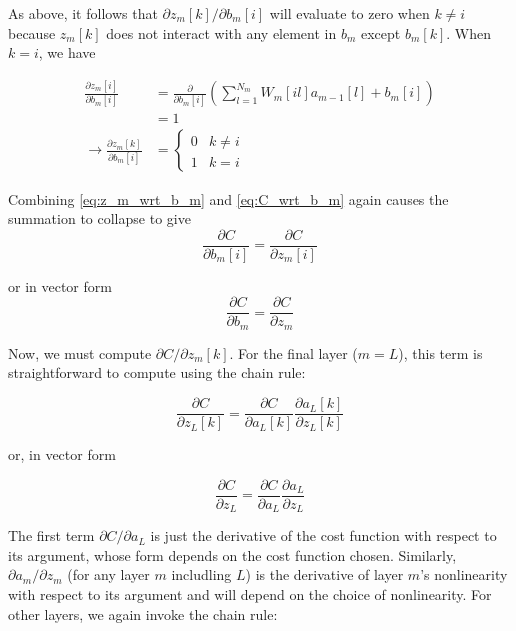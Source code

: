 As above, it follows that $\partial z_m[k]/\partial b_m[i]$ will evaluate to zero when $k \ne i$ because $z_m[k]$ does not interact with any element in $b_m$ except $b_m[k]$.  When $k = i$, we have

\begin{align}
\frac{\partial z_m[i]}{\partial b_m[i]} &= \frac{\partial}{\partial b_m[i]}\left(\sum_{l = 1}^{N_m} W_m[il] a_{m - 1}[l] + b_m[i]\right)\\
                                        &= 1\\
\rightarrow \frac{\partial z_m[k]}{\partial b_m[i]} &= \begin{cases}
0 & k \ne i\\
1 & k = i
\end{cases}
\label{eq:z_m_wrt_b_m}
\end{align}

Combining \cref{eq:z_m_wrt_b_m} and \cref{eq:C_wrt_b_m} again causes the summation to collapse to give
\begin{equation}
\frac{\partial C}{\partial b_m[i]} = \frac{\partial C}{\partial z_m[i]}
\end{equation}

or in vector form
\begin{equation}
\frac{\partial C}{\partial b_m} = \frac{\partial C}{\partial z_m}
\end{equation}

Now, we must compute $\partial C/\partial z_m[k]$.
For the final layer ($m = L$), this term is straightforward to compute using the chain rule:

$$
\frac{\partial C}{\partial z_L[k]} = \frac{\partial C}{\partial a_L[k]} \frac{\partial a_L[k]}{\partial z_L[k]}
$$

or, in vector form

$$
\frac{\partial C}{\partial z_L} = \frac{\partial C}{\partial a_L} \frac{\partial a_L}{\partial z_L}
$$

The first term $\partial C/\partial a_L$ is just the derivative of the cost function with respect to its argument, whose form depends on the cost function chosen.
Similarly, $\partial a_m/\partial z_m$ (for any layer $m$ includling $L$) is the derivative of layer $m$'s nonlinearity with respect to its argument and will depend on the choice of nonlinearity.
For other layers, we again invoke the chain rule:

